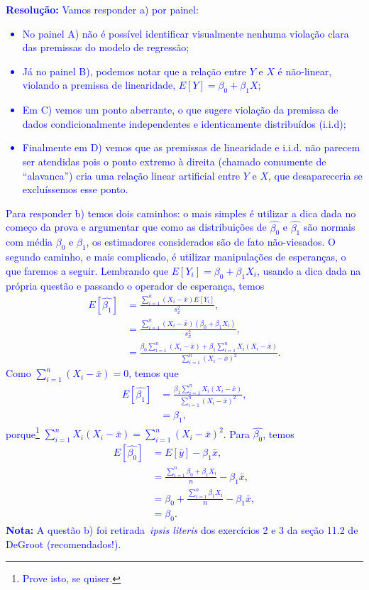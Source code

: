 \documentclass[a4paper,10pt, notitlepage]{report}
\begin{document}
\textcolor{blue}{
\textbf{Resolução:}
Vamos responder a) por painel:
\begin{itemize}
 \item No painel A) não é possível identificar visualmente nenhuma violação clara das premissas do modelo de regressão;
 \item Já no painel B), podemos notar que a relação entre $Y$ e $X$ é não-linear, violando a premissa de linearidade, $E[Y] = \beta_0 + \beta_1X$;
 \item Em C) vemos um ponto aberrante, o que sugere violação da premissa de dados condicionalmente independentes e identicamente distribuídos (i.i.d);
 \item Finalmente em D) vemos que as premissas de linearidade e i.i.d. não parecem ser atendidas pois o ponto extremo à direita (chamado comumente de ``alavanca'') cria uma relação linear artificial entre $Y$ e $X$, que desapareceria se excluíssemos esse ponto.
\end{itemize}
Para responder b) temos dois caminhos: o mais simples é utilizar a dica dada no começo da prova e argumentar que como as distribuições de $\hat{\beta_0}$ e $\hat{\beta_1}$ são normais com média $\beta_0$ e $\beta_1$, os estimadores considerados são de fato não-viesados.
O segundo caminho, e mais complicado, é utilizar manipulações de esperanças, o que faremos a seguir.
Lembrando que $E[Y_i] = \beta_0 + \beta_1 X_i$, usando a dica dada na própria questão e passando o operador de esperança, temos
\begin{align*}
 E[\hat{\beta_1}] &= \frac{\sum_{i=1}^n \left(X_i-\bar{x}\right)E[Y_i]}{s_x^2},\\&= \frac{\sum_{i=1}^n \left(X_i-\bar{x}\right)\left(\beta_0 + \beta_1 X_i\right)}{s_x^2},\\
 &= \frac{\beta_0\sum_{i=1}^n\left(X_i-\bar{x}\right) + \beta_1\sum_{i=1}^nX_i\left(X_i-\bar{x}\right)}{\sum_{i=1}^n \left(X_i-\bar{x}\right)^2}.
\end{align*}
Como $\sum_{i=1}^n\left(X_i-\bar{x}\right) = 0$, temos que 
\begin{align*}
  E[\hat{\beta_1}] &= \frac{\beta_1\sum_{i=1}^nX_i\left(X_i-\bar{x}\right)}{\sum_{i=1}^n \left(X_i-\bar{x}\right)^2},\\
  &= \beta_1,
\end{align*}
porque\footnote{\textcolor{blue}{Prove isto, se quiser.}} $\sum_{i=1}^nX_i\left(X_i-\bar{x}\right) = \sum_{i=1}^n \left(X_i-\bar{x}\right)^2$.
Para $\hat{\beta_0}$, temos 
\begin{align*}
  E[\hat{\beta_0}] &= E[\bar{y}] - \beta_1\bar{x},\\
  &= \frac{\sum_{i=1}^n \beta_0 + \beta_1X_i}{n} - \beta_1\bar{x},\\
  &= \beta_0  + \frac{\sum_{i=1}^n \beta_1X_i}{n} - \beta_1\bar{x},\\
  &= \beta_0.
\end{align*}
\textbf{Nota:} A questão b) foi retirada~\textit{ipsis literis} dos exercícios  2 e 3 da seção 11.2 de DeGroot (recomendados!). 
}
\end{document}
